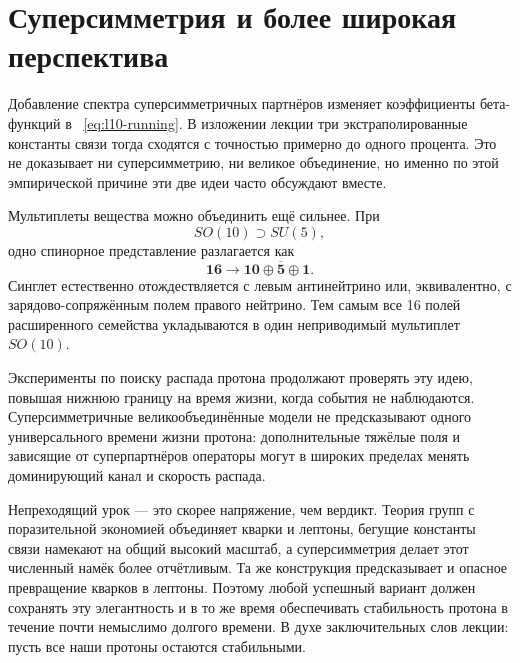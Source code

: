 \section{Суперсимметрия и более широкая перспектива}

Добавление спектра суперсимметричных партнёров изменяет коэффициенты бета-функций в ~\eqref{eq:l10-running}. В изложении лекции три экстраполированные константы связи тогда сходятся с точностью примерно до одного процента. Это не доказывает ни суперсимметрию, ни великое объединение, но именно по этой эмпирической причине эти две идеи часто обсуждают вместе.

Мультиплеты вещества можно объединить ещё сильнее. При
\begin{equation}
SO(10)\supset SU(5),
\end{equation}
одно спинорное представление разлагается как
\begin{equation}
\mathbf{16}
\longrightarrow
\mathbf{10}\oplus\overline{\mathbf5}\oplus\mathbf1.
\label{eq:l10-so10}
\end{equation}
Синглет естественно отождествляется с левым антинейтрино или, эквивалентно, с зарядово-сопряжённым полем правого нейтрино. Тем самым все 16 полей расширенного семейства укладываются в один неприводимый мультиплет \(SO(10)\).

Эксперименты по поиску распада протона продолжают проверять эту идею, повышая нижнюю границу на время жизни, когда события не наблюдаются. Суперсимметричные великообъединённые модели не предсказывают одного универсального времени жизни протона: дополнительные тяжёлые поля и зависящие от суперпартнёров операторы могут в широких пределах менять доминирующий канал и скорость распада.


Непреходящий урок — это скорее напряжение, чем вердикт. Теория групп с поразительной экономией объединяет кварки и лептоны, бегущие константы связи намекают на общий высокий масштаб, а суперсимметрия делает этот численный намёк более отчётливым. Та же конструкция предсказывает и опасное превращение кварков в лептоны. Поэтому любой успешный вариант должен сохранять эту элегантность и в то же время обеспечивать стабильность протона в течение почти немыслимо долгого времени. В духе заключительных слов лекции: пусть все наши протоны остаются стабильными.
